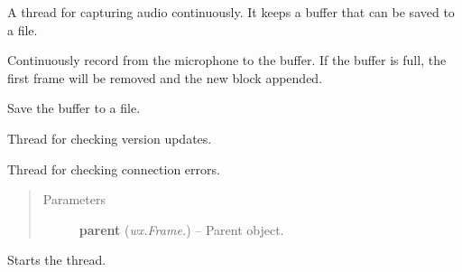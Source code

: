 \documentclass[letterpaper,10pt,english]{sphinxmanual}
\begin{document}

\begin{fulllineitems}
\label{api:wos.AudioRecorder}
A thread for capturing audio continuously. It keeps a buffer that can be saved to a file.

\begin{fulllineitems}
\label{api:wos.AudioRecorder.run}
Continuously record from the microphone to the buffer. If the buffer is full, the first frame will be removed and the new block appended.

\end{fulllineitems}


\begin{fulllineitems}
\label{api:wos.AudioRecorder.save}
Save the buffer to a file.

\end{fulllineitems}


\end{fulllineitems}


\begin{fulllineitems}
\label{api:wos.CHECK_UPDATE}
Thread for checking version updates.

\end{fulllineitems}


\begin{fulllineitems}
\label{api:wos.CONN_ERR_TH}
Thread for checking connection errors.
\begin{quote}\begin{description}
\item[{Parameters}] \leavevmode
\textbf{parent} (\emph{wx.Frame.}) -- Parent object.

\end{description}\end{quote}

\begin{fulllineitems}
\label{api:wos.CONN_ERR_TH.run}
Starts the thread.

\end{fulllineitems}


\end{fulllineitems}
\end{document}
